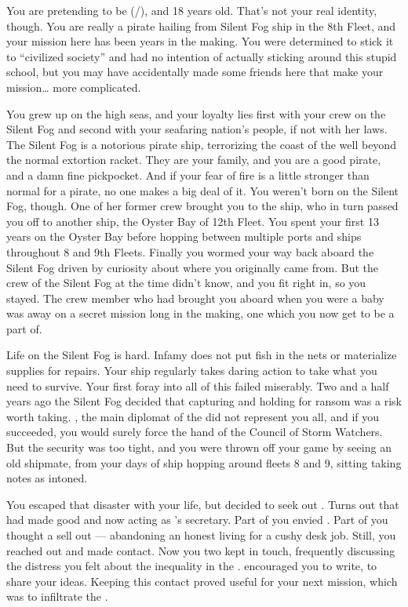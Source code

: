 \documentclass[char]{GL2020}
\begin{document}
\name{\cPirateChild{}}

You are pretending to be \cPirateChild{\full} (\cPirateChild{\they}/\cPirateChild{\them}), and 18 years old. That's not your real identity, though. You are really a \pShippie{} pirate hailing from Silent Fog ship in the 8th Fleet, and your mission here has been years in the making. You were determined to stick it to ``civilized society'' and had no intention of actually sticking around this stupid school, but you may have accidentally made some friends here that make your mission\ldots{} more complicated.

You grew up on the high seas, and your loyalty lies first with your crew on the Silent Fog and second with your seafaring nation's people, if not with her laws. The Silent Fog is a notorious pirate ship, terrorizing the coast of the \pFarm{} well beyond the normal extortion racket. They are your family, and you are a good pirate, and a damn fine pickpocket. And if your fear of fire is a little stronger than normal for a pirate, no one makes a big deal of it. You weren't born on the Silent Fog, though. One of her former crew brought you to the ship, who in turn passed you off to another ship, the Oyster Bay of 12th Fleet. You spent your first 13 years on the Oyster Bay before hopping between multiple ports and ships throughout 8 and 9th Fleets. Finally you wormed your way back aboard the Silent Fog driven by curiosity about where you originally came from. But the crew of the Silent Fog at the time didn't know, and you fit right in, so you stayed. The crew member who had brought you aboard when you were a baby was away on a secret mission long in the making, one which you now get to be a part of.

Life on the Silent Fog is hard. Infamy does not put fish in the nets or materialize supplies for repairs. Your ship regularly takes daring action to take what you need to survive. Your first foray into all of this failed miserably. Two and a half years ago the Silent Fog decided that capturing and holding \cHeadDiplomat{\full} for ransom was a risk worth taking. \cHeadDiplomat{}, the main diplomat of the \pShippies{} did not represent you all, and if you succeeded, you would surely force the hand of the Council of Storm Watchers. But the security was too tight, and you were thrown off your game by seeing an old shipmate, from your days of ship hopping around fleets 8 and 9, sitting taking notes as \cHeadDiplomat{} intoned. 

You escaped that disaster with your life, but decided to seek out \cChupLeader{\full}. Turns out that \cChupLeader{\they} had made good and now \cChupLeader{\were} acting as \cHeadDiplomant{}’s secretary. Part of you envied \cChupLeader{\them}. Part of you thought \cChupLeader{\them} a sell out — abandoning an honest living for a cushy desk job. Still, you reached out and made contact. Now you two kept in touch, frequently discussing the distress you felt about the inequality in the \pShip{}. \cChupLeader{} encouraged you to write, to share your ideas. Keeping this contact proved useful for your next mission, which was to infiltrate the \pSchool{}. 
\end{document}
